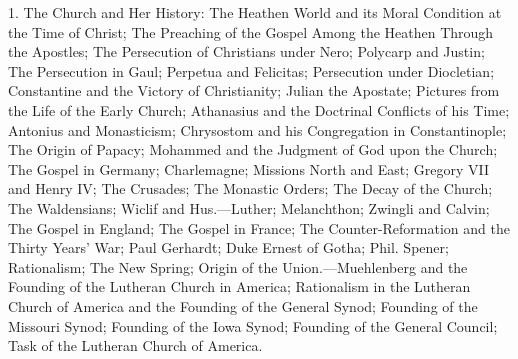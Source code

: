 1. The Church and Her History: The Heathen World and its Moral Condition at the Time of Christ; The Preaching of the Gospel Among the Heathen Through the Apostles; The Persecution of Christians under Nero; Polycarp and Justin; The Persecution in Gaul; Perpetua and Felicitas; Persecution under Diocletian; Constantine and the Victory of Christianity; Julian the Apostate; Pictures from the Life of the Early Church; Athanasius and the Doctrinal Conflicts of his Time; Antonius and Monasticism; Chrysostom and his Congregation in Constantinople; The Origin of Papacy; Mohammed and the Judgment of God upon the Church; The Gospel in Germany; Charlemagne; Missions North and East; Gregory VII and Henry IV; The Crusades; The Monastic Orders; The Decay of the Church; The Waldensians; Wiclif and Hus.—Luther; Melanchthon; Zwingli and Calvin; The Gospel in England; The Gospel in France; The Counter-Reformation and the Thirty Years’ War; Paul Gerhardt; Duke Ernest of Gotha; Phil. Spener; Rationalism; The New Spring; Origin of the Union.—Muehlenberg and the Founding of the Lutheran Church in America; Rationalism in the Lutheran Church of America and the Founding of the General Synod; Founding of the Missouri Synod; Founding of the Iowa Synod; Founding of the General Council; Task of the Lutheran Church of America.

